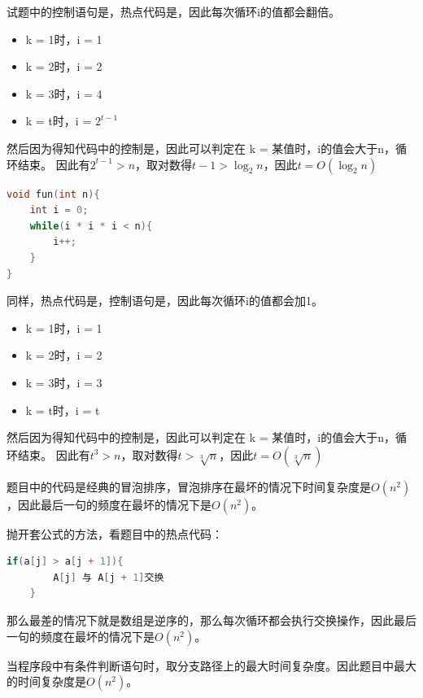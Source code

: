 \documentclass[b5paper,11pt]{article}
\begin{document}
\newpage{}


试题中的控制语句是，热点代码是，因此每次循环i的值都会翻倍。

\begin{itemize}
  \item k = 1时，i = 1
  \item k = 2时，i = 2
  \item k = 3时，i = 4
  \item k = t时，i = $2^{t-1}$
\end{itemize}
然后因为得知代码中的控制是，因此可以判定在 k = 某值时，i的值会大于n，循环结束。
因此有$2^{t-1} > n$，取对数得$t - 1 > \log_2 n$，因此$t = O(\log_2 n)$

\begin{lstlisting}[language=C]
void fun(int n){
    int i = 0;
    while(i * i * i < n){
        i++;
    }
}
\end{lstlisting}
同样，热点代码是，控制语句是，因此每次循环i的值都会加1。
\begin{itemize}
  \item k = 1时，i = 1
  \item k = 2时，i = 2
  \item k = 3时，i = 3
  \item k = t时，i = t
\end{itemize}
然后因为得知代码中的控制是，因此可以判定在 k = 某值时，i的值会大于n，循环结束。
因此有$t^3 > n$，取对数得$t > \sqrt[3]{n}$，因此$t = O(\sqrt[3]{n})$


题目中的代码是经典的冒泡排序，冒泡排序在最坏的情况下时间复杂度是$O(n^2)$，因此最后一句的频度在最坏的情况下是$O(n^2)$。

抛开套公式的方法，看题目中的热点代码：
\begin{lstlisting}[language=C]
    if(a[j] > a[j + 1]){
        A[j] 与 A[j + 1]交换
    }
\end{lstlisting}
那么最差的情况下就是数组是逆序的，那么每次循环都会执行交换操作，因此最后一句的频度在最坏的情况下是$O(n^2)$。

\newpage{}


当程序段中有条件判断语句时，取分支路径上的最大时间复杂度。因此题目中最大的时间复杂度是$O(n^2)$。
\end{document}

